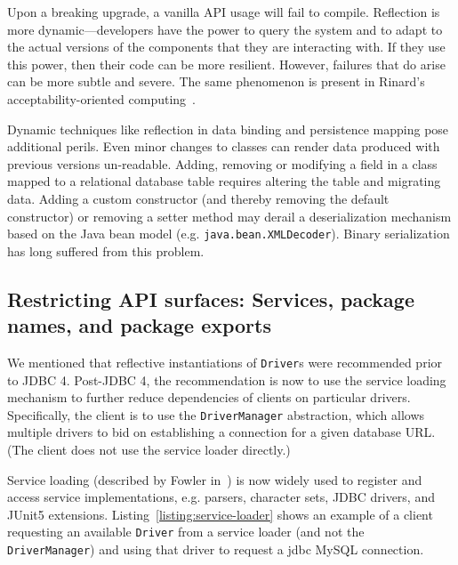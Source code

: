 Upon a breaking upgrade, a vanilla API usage will fail to compile. Reflection is more dynamic---developers have the power to query the system and to adapt to the actual versions of the components that they are interacting with. If they use this power, then their code can be more resilient. However, failures that do arise can be more subtle and severe. The same phenomenon is present in Rinard's acceptability-oriented computing~\cite{rinard03:_accep}.

Dynamic techniques like reflection in data binding and persistence mapping pose additional perils. Even minor changes to classes can render data produced with previous versions un-readable. Adding, removing or modifying a field in a class mapped to a relational database table requires altering the table and migrating data. Adding a custom constructor (and thereby removing the default constructor) or removing a setter method may derail a deserialization mechanism based on the Java bean model (e.g. \texttt{java.bean.XMLDecoder}). Binary serialization has long suffered from this problem. 

\subsection{Restricting API surfaces: Services, package names, and package exports}
We mentioned that reflective instantiations of \texttt{Driver}s were recommended prior to JDBC 4. Post-JDBC 4, the recommendation is now to use the service loading mechanism to further reduce dependencies of clients on particular drivers. Specifically, the client is to use the \texttt{DriverManager} abstraction, which allows multiple drivers to bid on establishing a connection for a given database URL. (The client does not use the service loader directly.) 



Service loading (described by Fowler in~\cite{fowler04:_inver_contr_contain_depen_injec}) is now widely used to register and access service implementations, e.g. parsers, character sets, JDBC drivers, and JUnit5 extensions. 
Listing~\ref{listing:service-loader} shows an example of a client requesting an available \texttt{Driver} from a service loader (and not the {\tt DriverManager}) and using that driver to request a jdbc MySQL connection.


